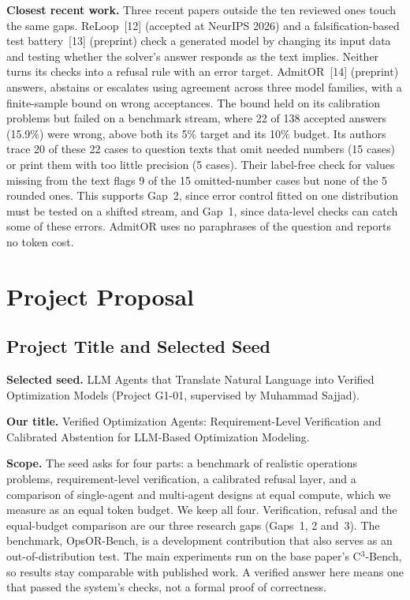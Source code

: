 \documentclass[11pt,a4paper]{article}
\newcommand{\cthree}{C$^3$-Bench}
\begin{document}
\textbf{Closest recent work.} Three recent papers outside the ten reviewed ones touch the same gaps. ReLoop~[12] (accepted at NeurIPS 2026) and a falsification-based test battery~[13] (preprint) check a generated model by changing its input data and testing whether the solver's answer responds as the text implies. Neither turns its checks into a refusal rule with an error target. AdmitOR~[14] (preprint) answers, abstains or escalates using agreement across three model families, with a finite-sample bound on wrong acceptances. The bound held on its calibration problems but failed on a benchmark stream, where 22 of 138 accepted answers (15.9\%) were wrong, above both its 5\% target and its 10\% budget. Its authors trace 20 of these 22 cases to question texts that omit needed numbers (15 cases) or print them with too little precision (5 cases). Their label-free check for values missing from the text flags 9 of the 15 omitted-number cases but none of the 5 rounded ones. This supports Gap~2, since error control fitted on one distribution must be tested on a shifted stream, and Gap~1, since data-level checks can catch some of these errors. AdmitOR uses no paraphrases of the question and reports no token cost.

\section{Project Proposal}
\label{sec:proposal}

\subsection{Project Title and Selected Seed}

\textbf{Selected seed.} LLM Agents that Translate Natural Language into Verified Optimization Models (Project G1-01, supervised by Muhammad Sajjad).

\textbf{Our title.} Verified Optimization Agents: Requirement-Level Verification and Calibrated Abstention for LLM-Based Optimization Modeling.

\textbf{Scope.} The seed asks for four parts: a benchmark of realistic operations problems, requirement-level verification, a calibrated refusal layer, and a comparison of single-agent and multi-agent designs at equal compute, which we measure as an equal token budget. We keep all four. Verification, refusal and the equal-budget comparison are our three research gaps (Gaps~1, 2 and~3). The benchmark, OpsOR-Bench, is a development contribution that also serves as an out-of-distribution test. The main experiments run on the base paper's \cthree{}, so results stay comparable with published work. A verified answer here means one that passed the system's checks, not a formal proof of correctness.
\end{document}
